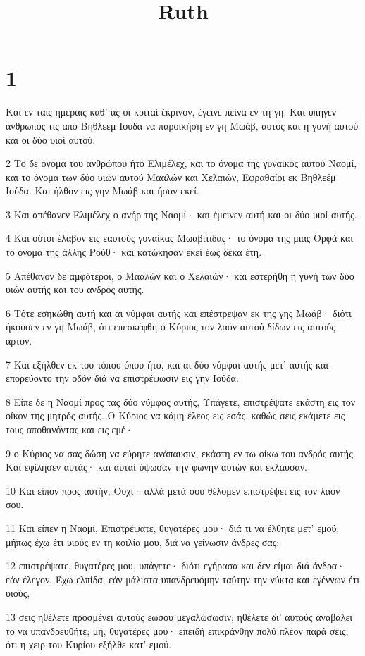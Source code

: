 

\title{Ruth}


\chapter{1}

\par Και εν ταις ημέραις καθ' ας οι κριταί έκρινον, έγεινε πείνα εν τη γη. Και υπήγεν άνθρωπός τις από Βηθλεέμ Ιούδα να παροικήση εν γη Μωάβ, αυτός και η γυνή αυτού και οι δύο υιοί αυτού.
\par 2 Το δε όνομα του ανθρώπου ήτο Ελιμέλεχ, και το όνομα της γυναικός αυτού Ναομί, και το όνομα των δύο υιών αυτού Μααλών και Χελαιών, Εφραθαίοι εκ Βηθλεέμ Ιούδα. Και ήλθον εις γην Μωάβ και ήσαν εκεί.
\par 3 Και απέθανεν Ελιμέλεχ ο ανήρ της Ναομί· και έμεινεν αυτή και οι δύο υιοί αυτής.
\par 4 Και ούτοι έλαβον εις εαυτούς γυναίκας Μωαβίτιδας· το όνομα της μιας Ορφά και το όνομα της άλλης Ρούθ· και κατώκησαν εκεί έως δέκα έτη.
\par 5 Απέθανον δε αμφότεροι, ο Μααλών και ο Χελαιών· και εστερήθη η γυνή των δύο υιών αυτής και του ανδρός αυτής.
\par 6 Τότε εσηκώθη αυτή και αι νύμφαι αυτής και επέστρεψαν εκ της γης Μωάβ· διότι ήκουσεν εν γη Μωάβ, ότι επεσκέφθη ο Κύριος τον λαόν αυτού δίδων εις αυτούς άρτον.
\par 7 Και εξήλθεν εκ του τόπου όπου ήτο, και αι δύο νύμφαι αυτής μετ' αυτής και επορεύοντο την οδόν διά να επιστρέψωσιν εις γην Ιούδα.
\par 8 Είπε δε η Ναομί προς τας δύο νύμφας αυτής, Υπάγετε, επιστρέψατε εκάστη εις τον οίκον της μητρός αυτής. Ο Κύριος να κάμη έλεος εις εσάς, καθώς σεις εκάμετε εις τους αποθανόντας και εις εμέ·
\par 9 ο Κύριος να σας δώση να εύρητε ανάπαυσιν, εκάστη εν τω οίκω του ανδρός αυτής. Και εφίλησεν αυτάς· και αυταί ύψωσαν την φωνήν αυτών και έκλαυσαν.
\par 10 Και είπον προς αυτήν, Ουχί· αλλά μετά σου θέλομεν επιστρέψει εις τον λαόν σου.
\par 11 Και είπεν η Ναομί, Επιστρέψατε, θυγατέρες μου· διά τι να έλθητε μετ' εμού; μήπως έχω έτι υιούς εν τη κοιλία μου, διά να γείνωσιν άνδρες σας;
\par 12 επιστρέψατε, θυγατέρες μου, υπάγετε· διότι εγήρασα και δεν είμαι διά άνδρα· εάν έλεγον, Έχω ελπίδα, εάν μάλιστα υπανδρευόμην ταύτην την νύκτα και εγέννων έτι υιούς,
\par 13 σεις ηθέλετε προσμένει αυτούς εωσού μεγαλώσωσιν; ηθέλετε δι' αυτούς αναβάλει το να υπανδρευθήτε; μη, θυγατέρες μου· επειδή επικράνθην πολύ πλέον παρά σεις, ότι η χειρ του Κυρίου εξήλθε κατ' εμού.
